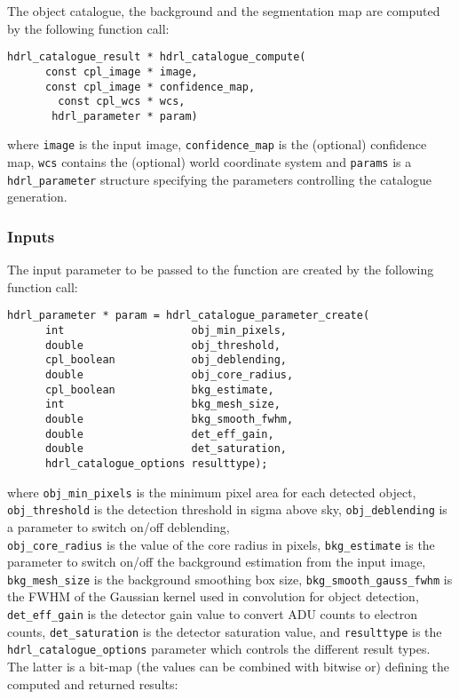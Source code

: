 The object catalogue, the background and the segmentation map are
computed by the following function call:

\begin{lstlisting}
hdrl_catalogue_result * hdrl_catalogue_compute(
      const cpl_image * image, 
      const cpl_image * confidence_map,
        const cpl_wcs * wcs, 
       hdrl_parameter * param)
\end{lstlisting}
             
where \verb+image+ is the input image, \verb+confidence_map+ is the
(optional) confidence map, \verb+wcs+ contains the (optional) world
coordinate system and \verb+params+ is a \verb+hdrl_parameter+
structure specifying the parameters controlling the catalogue
generation.
           
\subsubsection{Inputs}
\label{catalogue:inputs}

The input parameter to be passed to the function are created by the
following function call:

\begin{lstlisting}
hdrl_parameter * param = hdrl_catalogue_parameter_create(
      int                    obj_min_pixels,
      double                 obj_threshold, 
      cpl_boolean            obj_deblending,
      double                 obj_core_radius,
      cpl_boolean            bkg_estimate, 
      int                    bkg_mesh_size,
      double                 bkg_smooth_fwhm, 
      double                 det_eff_gain,
      double                 det_saturation,
      hdrl_catalogue_options resulttype);
\end{lstlisting}


where
  \verb+obj_min_pixels+ is the minimum pixel area for each detected object,
  \verb+obj_threshold+  is the detection threshold in sigma above sky,
  \verb+obj_deblending+ is a parameter to switch on/off deblending,\\
  \verb+obj_core_radius+ is the value of the core radius in pixels,
  \verb+bkg_estimate+  is the parameter to switch on/off the
  background estimation from the input image,
  \verb+bkg_mesh_size+ is the background smoothing box size,
  \verb+bkg_smooth_gauss_fwhm+ is the FWHM of the Gaussian kernel used
  in convolution for object detection,
  \verb+det_eff_gain+ is the detector gain value to convert ADU counts to electron counts,
  \verb+det_saturation+  is the detector saturation value, and
  \verb+resulttype+ is the \verb+hdrl_catalogue_options+ parameter which
controls the different result types. The latter is a bit-map (the
values can be combined with bitwise or) defining the computed and
returned results:

